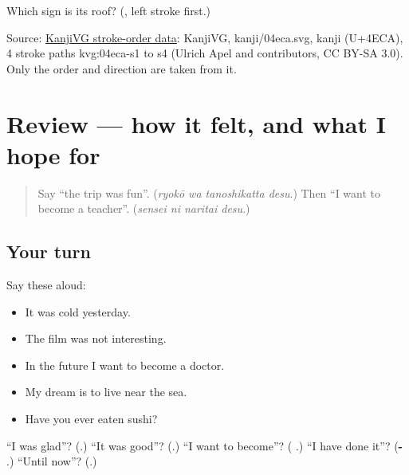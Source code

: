 \begin{tcolorbox}[breakable,colback=teal!4,colframe=teal!35!black,title={Before you move on}]
Which sign is its roof? (\textbf{}, left stroke first.)

Source: \href{https://github.com/KanjiVG/kanjivg/blob/master/kanji/04eca.svg}{KanjiVG stroke-order data}: KanjiVG, kanji/04eca.svg, kanji  (U+4ECA), 4 stroke paths kvg:04eca-s1 to s4 (Ulrich Apel and contributors, CC BY-SA 3.0). Only the order and direction are taken from it.
\end{tcolorbox}
\section[(review)]{Review — how it felt, and what I hope for}

\label{lesson:JA-R258-how-it-felt}



\begin{quote}
Say \textquotedblleft{}the trip was fun\textquotedblright{}. (\emph{ryokō wa tanoshikatta desu}.) Then \textquotedblleft{}I want to become a teacher\textquotedblright{}. (\emph{sensei ni naritai desu}.)
\end{quote}

\subsection*{Your turn}
Say these aloud:

\begin{itemize}
\raggedright
  \item It was cold yesterday.
  \item The film was not interesting.
  \item In the future I want to become a doctor.
  \item My dream is to live near the sea.
  \item Have you ever eaten sushi?
\end{itemize}

\begin{tcolorbox}[breakable,colback=teal!4,colframe=teal!35!black,title={Before you move on}]
\textquotedblleft{}I was glad\textquotedblright{}? (\textbf{}.) \textquotedblleft{}It was good\textquotedblright{}? (\textbf{}.) \textquotedblleft{}I want to become\textquotedblright{}? (\textbf{ }.) \textquotedblleft{}I have done it\textquotedblright{}? (\textbf{-  }.) \textquotedblleft{}Until now\textquotedblright{}? (\textbf{}.)
\end{tcolorbox}
